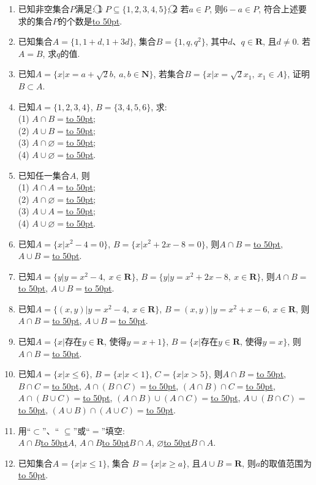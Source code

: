 \documentclass[10pt,a4paper]{article}
\newcommand{\blank}[1]{\underline{\hbox to #1pt{}}}
\begin{document}
\begin{enumerate}[1.]
\item 已知非空集合$P$满足: \textcircled{1} $P\subseteq \{1,2,3,4,5\}$; \textcircled{2} 若$a\in P$, 则$6-a\in P$, 符合上述要求的集合$P$的个数是\blank{50}.
\item 已知集合$A=\{1, 1+d, 1+3d\}$, 集合$B=\{1, q, q^2\}$, 其中$d$、$q\in \mathbf{R}$, 且$d\ne 0$. 若$A=B$, 求$q$的值.
\item 已知$A=\{x|x=a+\sqrt 2b,\ a,b\in \mathbf{N}\}$, 若集合$B=\{x|x=\sqrt 2x_1,\  x_1 \in A\}$, 证明$B\subset A$.
\item 已知$A=\{1, 2, 3, 4\}$, $B=\{3, 4, 5, 6\}$, 求:\\
(1) $A\cap B=$\blank{50};\\
(2) $A\cup B=$\blank{50};\\
(3) $A\cap\varnothing=$\blank{50};\\
(4) $A\cup\varnothing=$\blank{50}.
\item 已知任一集合$A$, 则\\
(1) $A\cap A=$\blank{50};\\
(2) $A\cap\varnothing=$\blank{50};\\
(3) $A\cup A=$\blank{50};\\
(4) $A\cup\varnothing=$\blank{50}.
\item 已知$A=\{x|x^2-4=0\}$, $B=\{x|x^2+2x-8=0\}$, 则$A\cap B=$\blank{50}, $A\cup B=$\blank{50}.
\item 已知$A=\{y|y=x^2-4, \ x\in\mathbf{R}\}$, $B=\{y|y=x^2+2x-8,\  x\in \mathbf{R}\}$, 则$A\cap B=$\blank{50}, $A\cup B=$\blank{50}.
\item 已知$A=\{(x, y)|y=x^2-4, \ x\in \mathbf{R}\}$, $B={(x, y)|y=x^2+x-6, \  x\in\mathbf{R}}$, 则$A\cap B=$\blank{50}, $ A\cup B=$\blank{50}.
\item 已知$A=\{x|$存在$y\in \mathbf{R}$, 使得$y=x+1\}$, $B=\{x|$存在$y\in \mathbf{R}$, 使得$y=x\}$, 则$A\cap B= $\blank{50}.
\item 已知$A=\{x|x\le 6\}$, $B=\{x|x<1\}$, $C=\{x|x>5\}$, 则$A\cap B=$\blank{50}, $B\cap C=$\blank{50}, $A\cap(B\cap C)=$\blank{50}, $(A\cap B)\cap C=$\blank{50}, $A\cap(B\cup C)=$\blank{50}, $(A\cap B)\cup(A\cap C)=$\blank{50}, $A\cup(B\cap C)=$\blank{50}, $ (A\cup B)\cap(A\cup C)=$\blank{50}.
\item 用``$\subset$''、`` $\subseteq$''或``$=$''填空:\\
$A\cap B$\blank{50}$A$, $A\cap B$\blank{50}$B\cap A$, $\varnothing$\blank{50}$B\cap A$.
\item 已知集合$A=\{x| x\le 1\}$, 集合 $B=\{x| x\ge a\}$, 且$A\cup B=\mathbf{R}$, 则$a$的取值范围为\blank{50}.

\end{enumerate}
\end{document}
